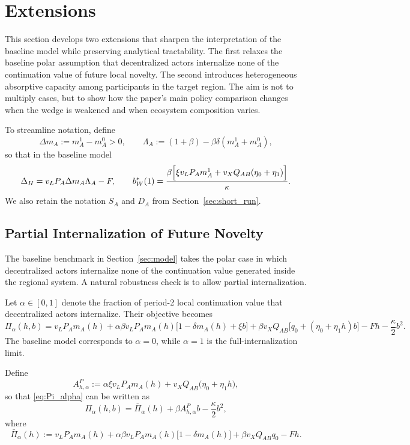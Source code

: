 \section{Extensions}
\label{sec:extensions}

This section develops two extensions that sharpen the interpretation of the baseline model while preserving analytical tractability. The first relaxes the baseline polar assumption that decentralized actors internalize none of the continuation value of future local novelty. The second introduces heterogeneous absorptive capacity among participants in the target region. The aim is not to multiply cases, but to show how the paper's main policy comparison changes when the wedge is weakened and when ecosystem composition varies.

To streamline notation, define
\[
\Delta m_A:=m_A^1-m_A^0>0,
\qquad
\Lambda_A:=(1+\beta)-\beta\delta(m_A^1+m_A^0),
\]
so that in the baseline model
\[
\Delta_H=v_LP_A\Delta m_A\Lambda_A-F,
\qquad
b_W^*(1)=
\frac{\beta\Bigl[\xi v_LP_A m_A^1+v_XQ_{AB}(\eta_0+\eta_1)\Bigr]}{\kappa}.
\]
We also retain the notation $S_A$ and $D_A$ from Section~\ref{sec:short_run}.

\subsection{Partial Internalization of Future Novelty}

The baseline benchmark in Section~\ref{sec:model} takes the polar case in which decentralized actors internalize none of the continuation value generated inside the regional system. A natural robustness check is to allow partial internalization.

Let $\alpha\in[0,1]$ denote the fraction of period-2 local continuation value that decentralized actors internalize. Their objective becomes
\begin{equation}
\Pi_{\alpha}(h,b)
=
v_LP_Am_A(h)
+
\alpha\beta v_LP_Am_A(h)\bigl[1-\delta m_A(h)+\xi b\bigr]
+
\beta v_XQ_{AB}\bigl[q_0+(\eta_0+\eta_1 h)b\bigr]
-Fh-\frac{\kappa}{2}b^2.
\label{eq:Pi_alpha}
\end{equation}
The baseline model corresponds to $\alpha=0$, while $\alpha=1$ is the full-internalization limit.

Define
\begin{equation}
A_{h,\alpha}^P
:=
\alpha\xi v_LP_Am_A(h)+v_XQ_{AB}\bigl(\eta_0+\eta_1 h\bigr),
\label{eq:Ah_alpha}
\end{equation}
so that \eqref{eq:Pi_alpha} can be written as
\begin{equation}
\Pi_{\alpha}(h,b)
=
\bar\Pi_{\alpha}(h)+\beta A_{h,\alpha}^P b-\frac{\kappa}{2}b^2,
\label{eq:Pi_alpha_compact}
\end{equation}
where
\begin{equation}
\bar\Pi_{\alpha}(h)
:=
v_LP_Am_A(h)
+
\alpha\beta v_LP_Am_A(h)\bigl[1-\delta m_A(h)\bigr]
+
\beta v_XQ_{AB}q_0-Fh.
\label{eq:Pibar_alpha}
\end{equation}


